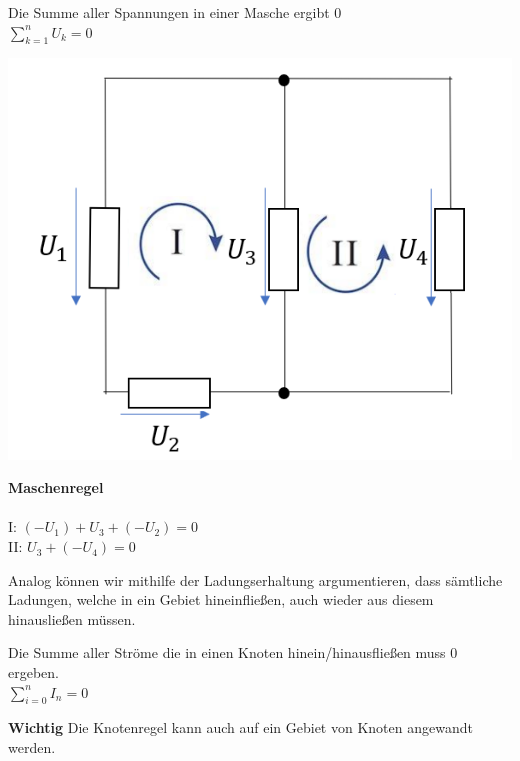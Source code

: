\beginip
Die Summe aller Spannungen in einer Masche ergibt $0$ \\
\formulaBegin
$\displaystyle \sum_{k=1}^n U_k = 0$
\formulaEnd

\iend

\begin{minipage}{0.6\textwidth}
	\begin{flushright}
		\includegraphics[scale=0.45]{img/maschenregel-2.png}
	\end{flushright}
\end{minipage}
\begin{minipage}{0.4\textwidth}
	\textbf{Maschenregel} \\ \\
	I: $\displaystyle (- U_1) + U_3 + (-U_2)  = 0$ \\
	II: $\displaystyle U_3 + (- U_4) = 0 $ \\
\end{minipage}

Analog können wir mithilfe der Ladungserhaltung argumentieren, dass sämtliche Ladungen, welche in ein Gebiet hineinfließen, auch wieder aus diesem hinausließen müssen.

\beginip
Die Summe aller Ströme die in einen Knoten hinein/hinausfließen muss $0$ ergeben. \\
\formulaBegin
$\displaystyle\sum_{i=0}^n I_n = 0 $
\formulaEnd
\iend

\textbf{Wichtig} Die Knotenregel kann auch auf ein Gebiet von Knoten angewandt werden. \\


